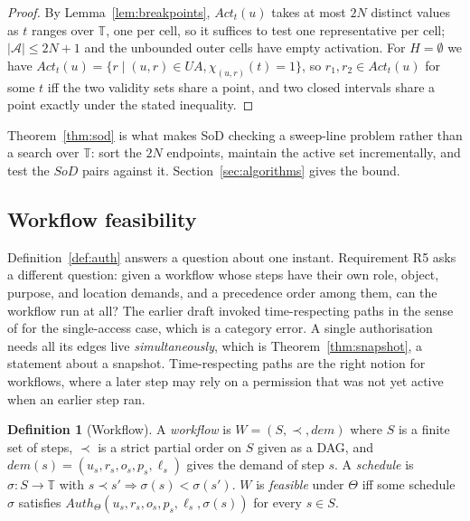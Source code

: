 \documentclass[11pt]{article}
\theoremstyle{definition}
\newtheorem{definition}{Definition}
\theoremstyle{plain}
\theoremstyle{remark}
\newcommand{\Auth}{\mathit{Auth}}
\newcommand{\Act}{\mathit{Act}}
\newcommand{\SoD}{\mathit{SoD}}
\newcommand{\Tdom}{\mathbb{T}}
\begin{document}
\begin{proof}
By Lemma~\ref{lem:breakpoints}, $\Act_t(u)$ takes at most $2N$ distinct values
as $t$ ranges over $\Tdom$, one per cell, so it suffices to test one
representative per cell; $|\mathcal{A}| \le 2N+1$ and the unbounded outer cells
have empty activation. For $H = \emptyset$ we have
$\Act_t(u) = \{r \mid (u,r) \in UA, \chi_{(u,r)}(t) = 1\}$, so
$r_1, r_2 \in \Act_t(u)$ for some $t$ iff the two validity sets share a point,
and two closed intervals share a point exactly under the stated inequality.
\end{proof}

Theorem~\ref{thm:sod} is what makes SoD checking a sweep-line problem rather
than a search over $\Tdom$: sort the $2N$ endpoints, maintain the active set
incrementally, and test the $\SoD$ pairs against it. Section~\ref{sec:algorithms}
gives the bound.

\subsection{Workflow feasibility}

Definition~\ref{def:auth} answers a question about one instant. Requirement R5
asks a different question: given a workflow whose steps have their own role,
object, purpose, and location demands, and a precedence order among them, can
the workflow run at all? The earlier draft invoked time-respecting paths in the
sense of \citet{holme2012temporal} for the single-access case, which is a
category error. A single authorisation needs all its edges live
\emph{simultaneously}, which is Theorem~\ref{thm:snapshot}, a statement about a
snapshot. Time-respecting paths are the right notion for workflows, where a
later step may rely on a permission that was not yet active when an earlier step
ran.

\begin{definition}[Workflow]
A \emph{workflow} is $W = (S, \prec, \mathit{dem})$ where $S$ is a finite set of
steps, $\prec$ is a strict partial order on $S$ given as a DAG, and
$\mathit{dem}(s) = (u_s, r_s, o_s, p_s, \ell_s)$ gives the demand of step $s$. A
\emph{schedule} is $\sigma : S \to \Tdom$ with $s \prec s' \Rightarrow
\sigma(s) < \sigma(s')$. $W$ is \emph{feasible} under $\Theta$ iff some schedule
$\sigma$ satisfies $\Auth_\Theta(u_s, r_s, o_s, p_s, \ell_s, \sigma(s))$ for
every $s \in S$.
\end{definition}
\end{document}

